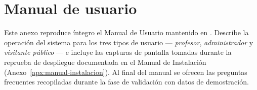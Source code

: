 \section{Manual de usuario}\label{apx:manual-usuario}
\justifying

Este anexo reproduce íntegro el Manual de Usuario mantenido en . Describe la operación del sistema para los tres tipos de usuario --- \emph{profesor}, \emph{administrador} y \emph{visitante público} --- e incluye las capturas de pantalla tomadas durante la reprueba de despliegue documentada en el Manual de Instalación (Anexo~\ref{apx:manual-instalacion}). Al final del manual se ofrecen las preguntas frecuentes recopiladas durante la fase de validación con datos de demostración.


